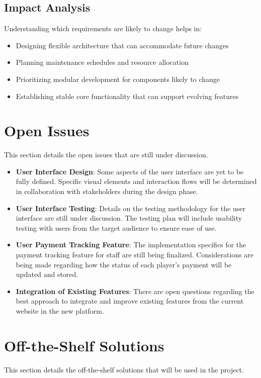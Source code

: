 \documentclass[12pt, titlepage]{article}
\begin{document}
\subsection{Impact Analysis}
Understanding which requirements are likely to change helps in:
\begin{itemize}
    \item Designing flexible architecture that can accommodate future changes
    \item Planning maintenance schedules and resource allocation
    \item Prioritizing modular development for components likely to change
    \item Establishing stable core functionality that can support evolving features
\end{itemize}

\section{Open Issues}
This section details the open issues that are still under discussion.
\begin{itemize}
    \item \textbf{User Interface Design}: Some aspects of the user interface are yet to be fully defined. Specific visual elements and interaction flows will be determined in collaboration with stakeholders during the design phase.
    \item \textbf{User Interface Testing}: Details on the testing methodology for the user interface are still under discussion. The testing plan will include usability testing with users from the target audience to ensure ease of use.
    \item \textbf{User Payment Tracking Feature}: The implementation specifics for the payment tracking feature for staff are still being finalized. Considerations are being made regarding how the status of each player's payment will be updated and stored.
    \item \textbf{Integration of Existing Features}: There are open questions regarding the best approach to integrate and improve existing features from the current website in the new platform.
\end{itemize}

\section{Off-the-Shelf Solutions}
This section details the off-the-shelf solutions that will be used in the project.
\end{document}
